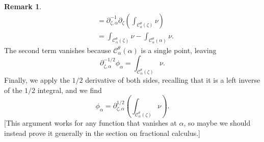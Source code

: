 \documentclass{article}
\newcommand{\fracderiv}[3]{\partial^{#1}_{#2, #3}}
\theoremstyle{definition}
\newtheorem{remark}[definition]{Remark}
\theoremstyle{plain}
\newenvironment{todo}{\color{Coral}}{\color{black}}
\newenvironment{old}{\color{RoyalBlue}}{\color{black}}
\begin{document}
\begin{remark}
\begin{old}
\begin{align*}
    & = \fracderiv{-1}{\zeta}{\alpha} \partial_\zeta \left( \int_{\mathcal{C}_a^\theta(\zeta)}\nu \right) \\
    & = \int_{\mathcal{C}_\alpha^\theta(\zeta)}\nu - \int_{\mathcal{C}_\alpha^\theta(\alpha)}\nu.
\end{align*}
The second term vanishes because $\mathcal{C}_\alpha^\theta(\alpha)$ is a single point, leaving
\[ \fracderiv{-1/2}{\zeta}{\alpha} \phi_\alpha = \int_{\mathcal{C}_\alpha^\theta(\zeta)}\nu. \]
Finally, we apply the $1/2$ derivative of both sides, recalling that it is a left inverse of the $1/2$ integral, and we find
\begin{equation}\label{eqn:formula--1/2}\phi_\alpha= \fracderiv{1/2}{\zeta}{\alpha} \left( \int_{\mathcal{C}_\alpha^\theta(\zeta)}\nu \right).\end{equation}
\begin{todo}[This argument works for any function that vanishes at $\alpha$, so maybe we should instead prove it generally in the section on fractional calculus.]\end{todo}
\end{old}
\end{remark}
\end{document}
